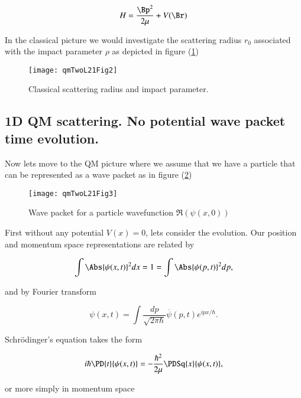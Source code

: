 \begin{equation}\label{eqn:qmTwoL21:50}
H = \frac{\Bp^2}{2 \mu} + V(\Br)
\end{equation}

In the classical picture we would investigate the scattering radius $r_0$ associated with the impact parameter $\rho$ as depicted in figure (\ref{fig:qmTwoL21:qmTwoL21Fig2})

\begin{figure}[htp]
   \centering
   \texttt{[image: qmTwoL21Fig2]}
   \caption{Classical scattering radius and impact parameter.}\label{fig:qmTwoL21:qmTwoL21Fig2}
\end{figure}

\subsection{1D QM scattering.  No potential wave packet time evolution.}

Now lets move to the QM picture where we assume that we have a particle that can be represented as a wave packet as in figure (\ref{fig:qmTwoL21:qmTwoL21Fig3})
\begin{figure}[htp]
   \centering
   \texttt{[image: qmTwoL21Fig3]}
   \caption{Wave packet for a particle wavefunction $\Re(\psi(x,0))$}\label{fig:qmTwoL21:qmTwoL21Fig3}
\end{figure}

First without any potential $V(x) = 0$, lets consider the evolution.  Our position and momentum space representations are related by

\begin{equation}\label{eqn:qmTwoL21:70}
\int \Abs{\psi(x, t)}^2 dx = 1 = \int \Abs{\psi(p, t)}^2 dp,
\end{equation}

and by Fourier transform

\begin{equation}\label{eqn:qmTwoL21:90}
\psi(x, t) = \int \frac{dp}{\sqrt{2 \pi \hbar}} \overline{\psi}(p, t) e^{i p x/\hbar}.
\end{equation}

Schr\"{o}dinger's equation takes the form

\begin{equation}\label{eqn:qmTwoL21:110}
i \hbar \PD{t}{\psi(x,t)} = - \frac{\hbar^2}{2 \mu} \PDSq{x}{\psi(x, t)},
\end{equation}

or more simply in momentum space

